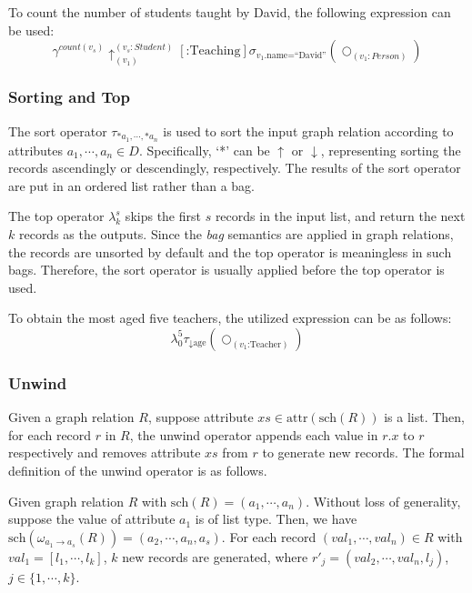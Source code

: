 \begin{example}
    To count the number of students taught by David, the following expression can be used:
    \begin{equation*}
        \gamma_{}^{count(v_s)}\uparrow_{(v_1)}^{(v_s:Student)}[\text{:Teaching}]\sigma_{v_1\text{.name=``David''}}(\bigcirc_{(v_1:Person)})
    \end{equation*}
\end{example}

\subsubsection{Sorting and Top}

The sort operator $\tau_{* a_1, \cdots, * a_n}$ is used to sort the input graph relation according to attributes $a_1, \cdots, a_n \in D$.
Specifically, `*' can be $\uparrow$ or $\downarrow$, representing sorting the records ascendingly or descendingly, respectively.
The results of the sort operator are put in an ordered list rather than a bag.

The top operator $\lambda_k^s$ skips the first $s$ records in the input list, and return the next $k$ records as the outputs.
Since the \emph{bag} semantics are applied in graph relations, the records are unsorted by default and the top operator is meaningless in such bags. 
Therefore, the sort operator is usually applied before the top operator is used.

\begin{example}
    To obtain the most aged five teachers, the utilized expression can be as follows:
    \begin{equation*}
        \lambda_{0}^{5}\tau_{\downarrow \text{age}}(\bigcirc_{(v_1\text{:Teacher})})
    \end{equation*}
\end{example}


\subsubsection{Unwind}

Given a graph relation $R$, suppose attribute $xs \in \text{attr}(\text{sch}(R))$ is a list.
Then, for each record $r$ in $R$, the unwind operator appends each value in $r.x$ to $r$ respectively and removes attribute $xs$ from $r$ to generate new records.
The formal definition of the unwind operator is as follows.

\begin{definition}
    Given graph relation $R$ with $\text{sch}(R) = (a_1, \cdots, a_n)$.
    Without loss of generality, suppose the value of attribute $a_1$ is of list type.
    Then, we have $\text{sch}(\omega_{a_1 \rightarrow a_s}(R)) = (a_2, \cdots, a_n, a_s)$.
    For each record $(val_1, \cdots, val_n) \in R$ with $val_1 = [l_1, \cdots, l_k]$,  $k$ new records are generated, where $r'_j = (val_2, \cdots, val_n, l_j)$, $j \in \{1, \cdots, k\}$.
\end{definition}

